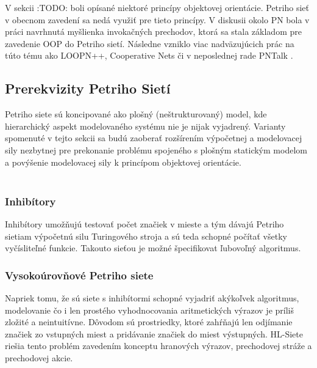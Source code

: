 V sekcii :TODO: boli opísané niektoré princípy objektovej orientácie. Petriho sieť v obecnom zavedení sa nedá využiť pre tieto princípy. V diskusii okolo PN bola v práci \cite{rozenberg1991advances} navrhnutá myšlienka invokačných prechodov, ktorá sa stala základom pre zavedenie OOP do Petriho sietí. Následne vzniklo viac nadväzujúcich prác na túto tému ako LOOPN++\cite{lakos1994loopn}, Cooperative Nets \cite{cooperative-nets} či v neposlednej rade PNTalk \cite{pntalk}.

\subsection{Prerekvizity Petriho Sietí}
Petriho siete sú koncipované ako plošný (neštrukturovaný) model, kde hierarchický aspekt modelovaného systému nie je nijak vyjadrený. Varianty spomenuté v tejto sekcii sa budú zaoberať rozšírením výpočetnej a modelovacej sily nezbytnej pre prekonanie problému spojeného s plošným statickým modelom a povýšenie modelovacej sily k princípom objektovej orientácie. \\\\
\subsubsection{Inhibítory}
Inhibítory umožňujú testovať počet značiek v mieste a tým dávajú Petriho sietiam výpočetnú silu Turingového stroja a sú teda schopné počítať všetky vyčísliteľné funkcie. Takouto sieťou je možné špecifikovat ľubovoľný algoritmus.
\subsubsection{Vysokoúrovňové Petriho siete}
Napriek tomu, že sú siete s inhibítormi schopné vyjadriť akýkoľvek algoritmus, modelovanie čo i len prostého vyhodnocovania aritmetických výrazov je príliš zložité a neintuitívne. Dôvodom sú prostriedky, ktoré zahŕňajú len odjímanie značiek zo vstupných miest a pridávanie značiek do miest výstupných. HL-Siete riešia tento problém zavedením konceptu hranových výrazov, prechodovej stráže a prechodovej akcie.

